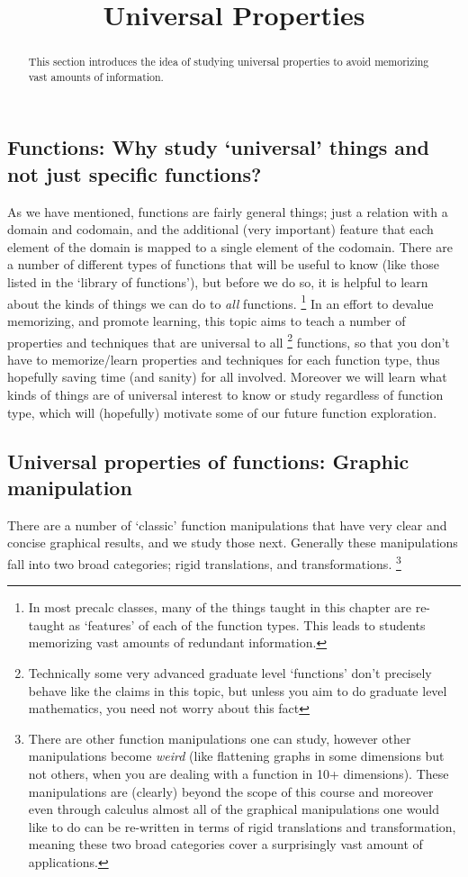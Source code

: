 \documentclass{ximera}
\title{Universal Properties}
\begin{document}
\begin{abstract}
    This section introduces the idea of studying universal properties to avoid memorizing vast amounts of information.
\end{abstract}
\maketitle

\subsection*{Functions: Why study `universal' things and not just specific functions?}

    As we have mentioned, functions are fairly general things; just a relation with a domain and codomain, and the additional (very important) feature that each element of the domain is mapped to a single element of the codomain. There are a number of different types of functions that will be useful to know (like those listed in the `library of functions'), but before we do so, it is helpful to learn about the kinds of things we can do to \textit{all} functions.%
    \footnote{%
        In most precalc classes, many of the things taught in this chapter are re-taught as `features' of each of the function types. This leads to students memorizing vast amounts of redundant information.%
        }
    In an effort to devalue memorizing, and promote learning, this topic aims to teach a number of properties and techniques that are universal to all%
    \footnote{%
        Technically some very advanced graduate level `functions' don't precisely behave like the claims in this topic, but unless you aim to do graduate level mathematics, you need not worry about this fact%
        }
    functions, so that you don't have to memorize/learn properties and techniques for each function type, thus hopefully saving time (and sanity) for all involved. Moreover we will learn what kinds of things are of universal interest to know or study regardless of function type, which will (hopefully) motivate some of our future function exploration.

\subsection*{Universal properties of functions: Graphic manipulation}

    There are a number of `classic' function manipulations that have very clear and concise graphical results, and we study those next. Generally these manipulations fall into two broad categories; rigid translations, and transformations.%
    \footnote{%
        There are other function manipulations one can study, however other manipulations become \textit{weird} (like flattening graphs in some dimensions but not others, when you are dealing with a function in 10+ dimensions). These manipulations are (clearly) beyond the scope of this course and moreover even through calculus almost all of the graphical manipulations one would like to do can be re-written in terms of rigid translations and transformation, meaning these two broad categories cover a surprisingly vast amount of applications.%
        }
    
\end{document}
